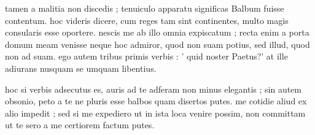 


 tamen a malitia non discedis ; tenuiculo apparatu significas Balbum fuisse contentum. hoc videris dicere, cum reges tam sint continentes, multo magis consularis esse oportere. nescis me ab illo omnia expiscatum ; recta enim a porta domum meam venisse neque hoc admiror, quod non suam potius, sed illud, quod non ad suam. ego autem tribus primis verbis : ' quid noster Paetus?' at ille adiurans nusquam se umquam libentius.

 hoc si verbis adsecutus es, auris ad te adferam non minus elegantis ; sin autem obsonio, peto a te ne pluris esse balbos quam disertos putes. me cotidie aliud ex alio impedit ; sed si me expediero ut in ista loca venire possim, non committam ut te sero a me certiorem factum putes.

